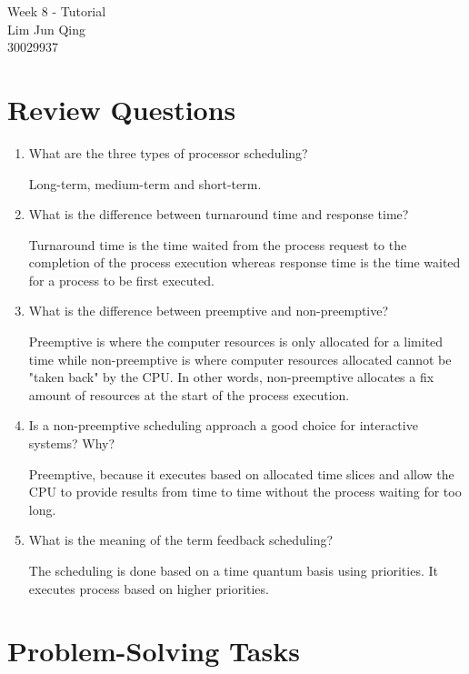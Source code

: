 \documentclass[17pt, a4paper]{article}
\begin{document}
	
	\begin{center}
		{\Large Week 8 - Tutorial}\\
		\vspace{5mm}
		{\large Lim Jun Qing}\\
		\vspace{3mm}
		{\large 30029937}\\
		\vspace{3mm}
	\end{center}
	
	\section{Review Questions}
	\begin{enumerate}
		\item What are the three types of processor scheduling?
		
		Long-term, medium-term and short-term.
		
		\item What is the difference between turnaround time and response time?
		
		Turnaround time is the time waited from the process request to the completion of the process execution whereas response time is the time waited for a process to be first executed. 
		
		\item What is the difference between preemptive and non-preemptive?
		
		Preemptive is where the computer resources is only allocated for a limited time while non-preemptive is where computer resources allocated cannot be "taken back" by the CPU. In other words, non-preemptive allocates a fix amount of resources at the start of the process execution.
		
		\item Is a non-preemptive scheduling approach a good choice for interactive systems? Why?
		
		Preemptive, because it executes based on allocated time slices and allow the CPU to provide results from time to time without the process waiting for too long.
		
		\item What is the meaning of the term feedback scheduling?
		
		The scheduling is done based on a time quantum basis using priorities. It executes process based on higher priorities.
	\end{enumerate}

	\section{Problem-Solving Tasks}
\end{document}
